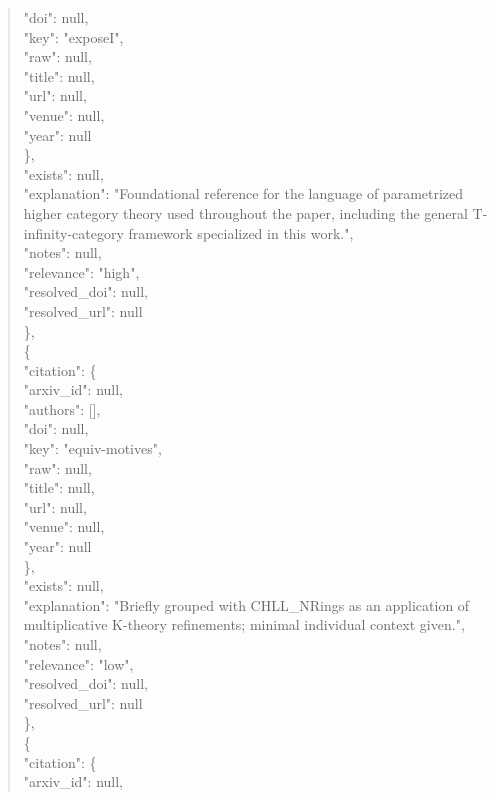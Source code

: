 \documentclass[11pt]{article}
\begin{document}
\begin{quote}
        "doi": null,\\
        "key": "exposeI",\\
        "raw": null,\\
        "title": null,\\
        "url": null,\\
        "venue": null,\\
        "year": null\\
      \},\\
      "exists": null,\\
      "explanation": "Foundational reference for the language of parametrized higher category theory used throughout the paper, including the general T-infinity-category framework specialized in this work.",\\
      "notes": null,\\
      "relevance": "high",\\
      "resolved\_doi": null,\\
      "resolved\_url": null\\
    \},\\
    \{\\
      "citation": \{\\
        "arxiv\_id": null,\\
        "authors": [],\\
        "doi": null,\\
        "key": "equiv-motives",\\
        "raw": null,\\
        "title": null,\\
        "url": null,\\
        "venue": null,\\
        "year": null\\
      \},\\
      "exists": null,\\
      "explanation": "Briefly grouped with CHLL\_NRings as an application of multiplicative K-theory refinements; minimal individual context given.",\\
      "notes": null,\\
      "relevance": "low",\\
      "resolved\_doi": null,\\
      "resolved\_url": null\\
    \},\\
    \{\\
      "citation": \{\\
        "arxiv\_id": null,\\

\end{quote}
\end{document}
